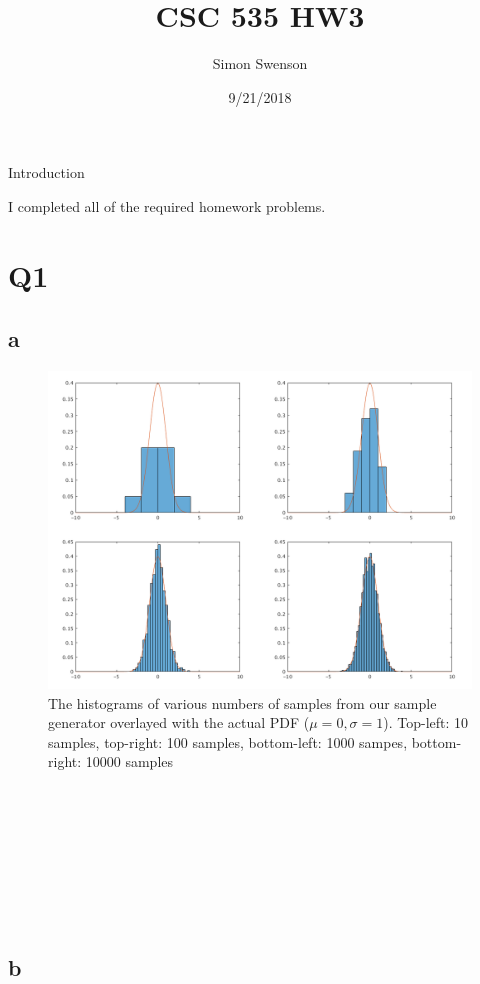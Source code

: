 \documentclass{article}
\title{CSC 535 HW3}
\date{9/21/2018}
\author{Simon Swenson}
\begin{document}
\maketitle
{}

\large Introduction

\small I completed all of the required homework problems.

\section{Q1}

\subsection{a}

\begin{figure}[!ht]
	\centering
	\includegraphics[width=120mm]{q1-all-samples.png}
	\caption{The histograms of various numbers of samples from our sample 
        generator overlayed with the actual PDF ($\mu = 0, \sigma = 1$). 
        Top-left: 10 samples, top-right: 100 samples, bottom-left: 1000 sampes, 
        bottom-right: 10000 samples}
\end{figure}

~\\
~\\
~\\
~\\
~\\
~\\
~\\

\subsection{b}
\end{document}
